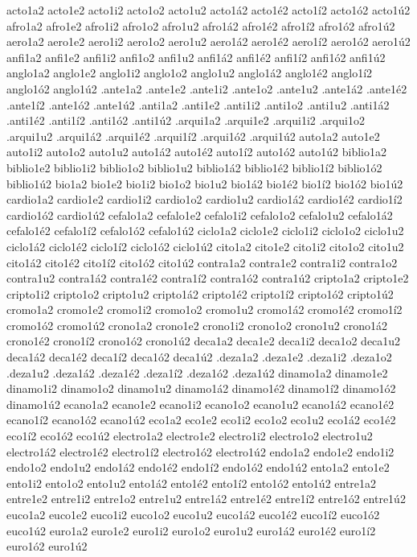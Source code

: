 {acto1a2 acto1e2 acto1i2 acto1o2 acto1u2 acto1á2 acto1é2 acto1í2 acto1ó2 acto1ú2 
afro1a2 afro1e2 afro1i2 afro1o2 afro1u2 afro1á2 afro1é2 afro1í2 afro1ó2 afro1ú2 
aero1a2 aero1e2 aero1i2 aero1o2 aero1u2 aero1á2 aero1é2 aero1í2 aero1ó2 aero1ú2 
anfi1a2 anfi1e2 anfi1i2 anfi1o2 anfi1u2 anfi1á2 anfi1é2 anfi1í2 anfi1ó2 anfi1ú2 
anglo1a2 anglo1e2 anglo1i2 anglo1o2 anglo1u2 anglo1á2 anglo1é2 anglo1í2 anglo1ó2 anglo1ú2 
.ante1a2 .ante1e2 .ante1i2 .ante1o2 .ante1u2 .ante1á2 .ante1é2 .ante1í2 .ante1ó2 .ante1ú2 
.anti1a2 .anti1e2 .anti1i2 .anti1o2 .anti1u2 .anti1á2 .anti1é2 .anti1í2 .anti1ó2 .anti1ú2 
.arqui1a2 .arqui1e2 .arqui1i2 .arqui1o2 .arqui1u2 .arqui1á2 .arqui1é2 .arqui1í2 .arqui1ó2 .arqui1ú2 
auto1a2 auto1e2 auto1i2 auto1o2 auto1u2 auto1á2 auto1é2 auto1í2 auto1ó2 auto1ú2 
biblio1a2 biblio1e2 biblio1i2 biblio1o2 biblio1u2 biblio1á2 biblio1é2 biblio1í2 biblio1ó2 biblio1ú2 
bio1a2 bio1e2 bio1i2 bio1o2 bio1u2 bio1á2 bio1é2 bio1í2 bio1ó2 bio1ú2 
cardio1a2 cardio1e2 cardio1i2 cardio1o2 cardio1u2 cardio1á2 cardio1é2 cardio1í2 cardio1ó2 cardio1ú2 
cefalo1a2 cefalo1e2 cefalo1i2 cefalo1o2 cefalo1u2 cefalo1á2 cefalo1é2 cefalo1í2 cefalo1ó2 cefalo1ú2 
ciclo1a2 ciclo1e2 ciclo1i2 ciclo1o2 ciclo1u2 ciclo1á2 ciclo1é2 ciclo1í2 ciclo1ó2 ciclo1ú2 
cito1a2 cito1e2 cito1i2 cito1o2 cito1u2 cito1á2 cito1é2 cito1í2 cito1ó2 cito1ú2 
contra1a2 contra1e2 contra1i2 contra1o2 contra1u2 contra1á2 contra1é2 contra1í2 contra1ó2 contra1ú2 
cripto1a2 cripto1e2 cripto1i2 cripto1o2 cripto1u2 cripto1á2 cripto1é2 cripto1í2 cripto1ó2 cripto1ú2 
cromo1a2 cromo1e2 cromo1i2 cromo1o2 cromo1u2 cromo1á2 cromo1é2 cromo1í2 cromo1ó2 cromo1ú2 
crono1a2 crono1e2 crono1i2 crono1o2 crono1u2 crono1á2 crono1é2 crono1í2 crono1ó2 crono1ú2 
deca1a2 deca1e2 deca1i2 deca1o2 deca1u2 deca1á2 deca1é2 deca1í2 deca1ó2 deca1ú2 
.deza1a2 .deza1e2 .deza1i2 .deza1o2 .deza1u2 .deza1á2 .deza1é2 .deza1í2 .deza1ó2 .deza1ú2 
dinamo1a2 dinamo1e2 dinamo1i2 dinamo1o2 dinamo1u2 dinamo1á2 dinamo1é2 dinamo1í2 dinamo1ó2 dinamo1ú2 
ecano1a2 ecano1e2 ecano1i2 ecano1o2 ecano1u2 ecano1á2 ecano1é2 ecano1í2 ecano1ó2 ecano1ú2 
eco1a2 eco1e2 eco1i2 eco1o2 eco1u2 eco1á2 eco1é2 eco1í2 eco1ó2 eco1ú2 
electro1a2 electro1e2 electro1i2 electro1o2 electro1u2 electro1á2 electro1é2 electro1í2 electro1ó2 electro1ú2 
endo1a2 endo1e2 endo1i2 endo1o2 endo1u2 endo1á2 endo1é2 endo1í2 endo1ó2 endo1ú2 
ento1a2 ento1e2 ento1i2 ento1o2 ento1u2 ento1á2 ento1é2 ento1í2 ento1ó2 ento1ú2 
entre1a2 entre1e2 entre1i2 entre1o2 entre1u2 entre1á2 entre1é2 entre1í2 entre1ó2 entre1ú2 
euco1a2 euco1e2 euco1i2 euco1o2 euco1u2 euco1á2 euco1é2 euco1í2 euco1ó2 euco1ú2 
euro1a2 euro1e2 euro1i2 euro1o2 euro1u2 euro1á2 euro1é2 euro1í2 euro1ó2 euro1ú2 
}
